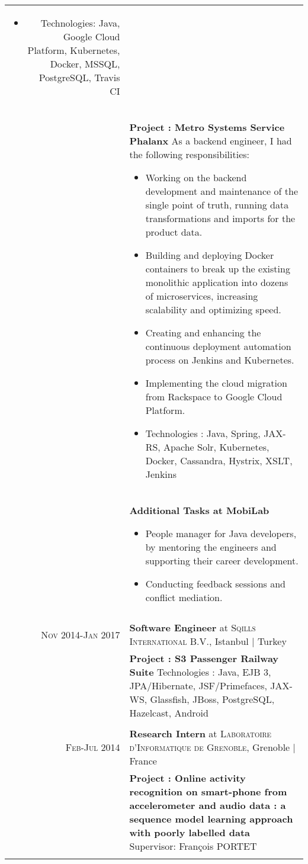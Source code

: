 \documentclass[a4paper,10pt]{article} %
\begin{document}
\begin{longtable}{r|p{13cm}}
{\begin{itemize}
  \item Technologies: Java, Google Cloud Platform, Kubernetes, Docker, MSSQL, PostgreSQL, Travis CI   
\end{itemize}
}\\
& \footnotesize{\textbf{Project : Metro Systems Service Phalanx}
\newline
As a backend engineer, I had the following responsibilities:
\begin{itemize}
  \item Working on the backend development and maintenance of the single point of truth, running data transformations and imports for the product data.
  \item Building and deploying Docker containers to break up the existing monolithic application into dozens of microservices, increasing scalability and optimizing speed.
  \item Creating and enhancing the continuous deployment automation process on Jenkins and Kubernetes.
  \item Implementing the cloud migration from Rackspace to Google Cloud Platform.
  \item Technologies : Java, Spring, JAX-RS, Apache Solr, Kubernetes, Docker, Cassandra, Hystrix, XSLT, Jenkins  
\end{itemize}
}\\
& \footnotesize{\textbf{Additional Tasks at MobiLab}
\newline
\begin{itemize}
  \item People manager for Java developers,  by mentoring the engineers and supporting their career development.	
  \item Conducting feedback sessions and conflict mediation.
\end{itemize}
}\\

\multicolumn{2}{c}{} \\

\textsc{Nov 2014-Jan 2017} & \textbf{Software Engineer} at \textsc{Sqills International B.V.}, Istanbul | Turkey \emph{}\\
& \footnotesize{\textbf{Project : S3 Passenger Railway Suite}
\newline
Technologies : Java, EJB 3, JPA/Hibernate, JSF/Primefaces, JAX-WS, Glassfish, JBoss, PostgreSQL, Hazelcast, Android
}\\
\multicolumn{2}{c}{} \\

\pagebreak

\textsc{Feb-Jul 2014} & \textbf{Research Intern} at \textsc{Laboratoire d'Informatique de Grenoble}, Grenoble | France \emph{}\\
& \footnotesize{\textbf{Project : Online activity recognition on smart-phone from accelerometer and audio data : a sequence model learning approach with poorly labelled data}
\newline
Supervisor: François PORTET
}\\
\multicolumn{2}{c}{} \\

\end{longtable}
\end{document}
